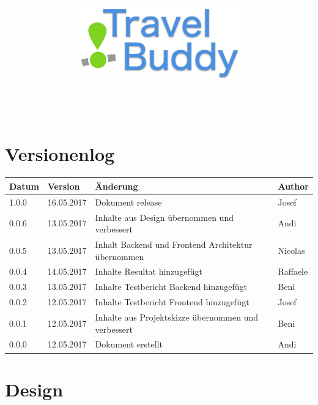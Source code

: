 \documentclass[a4paper,10pt,xetex]{article}
\title{
  \includegraphics[width=7cm]{travel-buddy_white}\\[\bigskipamount]
  \documenttitle\\[\bigskipamount]
}
\author{\documentauthors}
\date{\parbox{\linewidth}{\centering%
  IT15TA ZH \hspace*{3cm} Gruppe 3\endgraf\bigskip
  Dokumentversion \documentversion, \documentdate\endgraf
}}
\begin{document}

\maketitle\newpage

{
\hypersetup{linkcolor=black}
\setcounter{tocdepth}{4}
\tableofcontents
}

\newpage

\section{Versionenlog}\label{versionenlog}

\tabulinesep=1.2mm

\begin{longtabu} to \textwidth { | l | l | X[l] | l | }
  \hline
  \textbf{Datum} & \textbf{Version} & \textbf{Änderung} & \textbf{Author} \\
  \hline
  \endhead

  1.0.0 & 16.05.2017 & Dokument release & Josef\\
  \hline

  0.0.6 & 13.05.2017 & Inhalte aus Design übernommen und verbessert & Andi\\
  \hline

  0.0.5 & 13.05.2017 & Inhalt Backend und Frontend Architektur übernommen & Nicolas\\
  \hline

  0.0.4 & 14.05.2017 & Inhalte Resultat hinzugefügt & Raffaele\\
  \hline

  0.0.3 & 13.05.2017 & Inhalte Testbericht Backend hinzugefügt & Beni\\
  \hline

  0.0.2 & 12.05.2017 & Inhalte Testbericht Frontend hinzugefügt & Josef\\
  \hline

  0.0.1 & 12.05.2017 & Inhalte aus Projektskizze übernommen und verbessert & Beni\\
  \hline

  0.0.0 & 12.05.2017 & Dokument erstellt & Andi\\
  \hline
\end{longtabu}
\newpage



% 

\section{Design}


\end{document}
